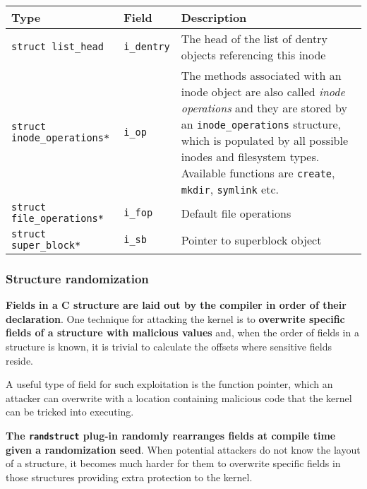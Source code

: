 \documentclass[10pt,a4paper]{article}
\begin{document}
\begin{center}
\begin{tabular}{l|l|p{13cm}} 

\toprule
Type & Field & Description \\
\midrule
\texttt{struct list\_head} & \texttt{i\_dentry} & The head of the list of dentry objects referencing this inode 

\\
\texttt{struct inode\_operations*} & \texttt{i\_op} & The methods associated with an inode object are also called \textit{inode operations} and they are stored by an \texttt{inode\_operations} structure, which is populated by all possible inodes and filesystem types. Available functions are \texttt{create}, \texttt{mkdir}, \texttt{symlink} etc.



\\
\texttt{struct file\_operations*} & \texttt{i\_fop} & Default file operations 

\\
\texttt{struct super\_block*} & \texttt{i\_sb} & Pointer to superblock object 

\\
 
\bottomrule
\end{tabular}
\end{center}




\subsubsection{Structure randomization}

\textbf{Fields in a C structure are laid out by the compiler in order of their declaration}. One technique for attacking the kernel is to \textbf{overwrite specific fields of a structure with malicious values} and, when the order of fields in a structure is known, it is trivial to calculate the offsets where sensitive fields reside. 

A useful type of field for such exploitation is the function pointer, which an attacker can overwrite with a location containing malicious code that the kernel can be tricked into executing. 

\textbf{The \texttt{randstruct} plug-in randomly rearranges fields at compile time given a randomization seed}. When potential attackers do not know the layout of a structure, it becomes much harder for them to overwrite specific fields in those structures providing extra protection to the kernel. 
\end{document}
